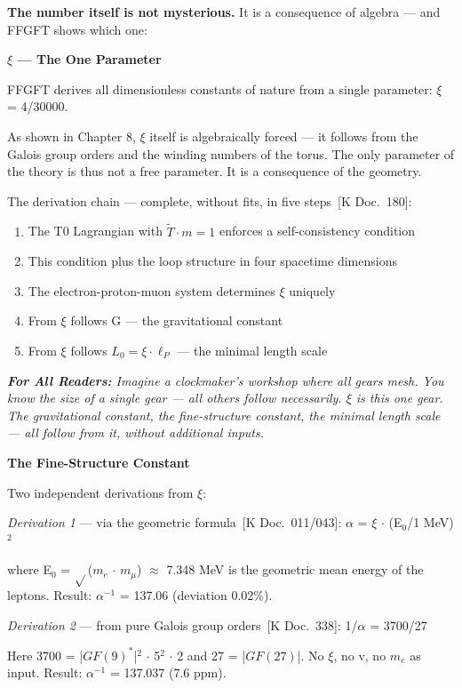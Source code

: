 \documentclass[11pt,oneside]{book}
\newcommand{\status}[1]{\penalty10000\,{\scriptsize\textcolor{gray!60}{[#1]}}}
\newenvironment{laierspur}{%
  \par\vspace{4pt}%
  \noindent\small\itshape\color{blue!60!black}%
  \textbf{For All Readers:}\enspace\ignorespaces}{%
  \par\vspace{4pt}\normalsize\normalfont\normalcolor}
\begin{document}
\textbf{The number itself is not mysterious.} It is a consequence of
algebra --- and FFGFT shows which one:

\textbf{$\xi$ — The One Parameter}

FFGFT derives all dimensionless constants of nature from a single parameter:
$\xi$ = 4/30000.

As shown in Chapter 8, $\xi$ itself is algebraically forced — it follows from
the Galois group orders and the winding numbers of the torus. The only
parameter of the theory is thus not a free parameter. It is a consequence of
the geometry.

The derivation chain — complete, without fits, in five steps \status{K Doc.~180}:

\begin{enumerate}
  \item The T0 Lagrangian with $\tilde{T}\cdot m=1$ enforces a self-consistency condition
  \item This condition plus the loop structure in four spacetime dimensions
  \item The electron-proton-muon system determines $\xi$ uniquely
  \item From $\xi$ follows G — the gravitational constant
  \item From $\xi$ follows $L_0 = \xi \cdot \ell_P$ — the minimal length scale
\end{enumerate}

\begin{laierspur}
Imagine a clockmaker's workshop where all gears mesh. You know the size
of a single gear — all others follow necessarily. $\xi$ is this one gear. The
gravitational constant, the fine-structure constant, the minimal length
scale — all follow from it, without additional inputs.
\end{laierspur}

\textbf{The Fine-Structure Constant}

Two independent derivations from $\xi$:

\textit{Derivation 1} — via the geometric formula \status{K Doc.~011/043}:
$\alpha$ = $\xi$ $\cdot$ (E$_0$/1 MeV)$^2$

where E$_0$ = $\sqrt{}$($m_e$ $\cdot$ $m_\mu$) $\approx$ 7.348 MeV is the geometric mean energy
of the leptons. Result: $\alpha^{-1}$ = 137.06 (deviation 0.02\%).

\textit{Derivation 2} — from pure Galois group orders \status{K Doc.~338}:
1/$\alpha$ = 3700/27

Here 3700 = |$GF(9)^*$|$^2$ $\cdot$ 5$^2$ $\cdot$ 2 and 27 = |$GF(27)$|. No $\xi$,
no v, no $m_e$ as input. Result: $\alpha^{-1}$ = 137.037 (7.6 ppm).
\end{document}
